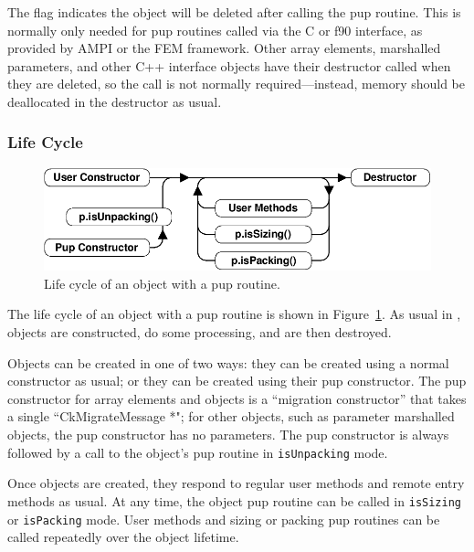 The  flag indicates the object will be deleted
after calling the pup routine.  This is normally only needed for
pup routines called via the C or f90 interface, as provided by 
AMPI or the FEM framework.  Other \charmpp{} array elements, 
marshalled parameters, and other C++ interface objects 
have their destructor called when they are deleted, so the 
 call is not normally required---instead,
memory should be deallocated in the destructor as usual.


\subsubsection{Life Cycle}
\label{sec:lifecycle}

\begin{figure}[h]
\begin{center}
\includegraphics[width=6.0in]{fig/pup}
\end{center}
\caption{Life cycle of an object with a pup routine.}
\label{fig:pup}
\end{figure}

The life cycle of an object with a pup routine is shown in 
Figure~\ref{fig:pup}.  As usual in \CC{}, objects are 
constructed, do some processing, and are then destroyed.

Objects can be created in one of two ways: they can
be created using a normal constructor as usual; or they
can be created using their pup constructor.  The pup constructor
for \charmpp{} array elements and  objects
is a ``migration constructor'' that takes a single ``CkMigrateMessage *";
for other objects, such as parameter marshalled objects,
the pup constructor has no parameters.  The pup constructor
is always followed by a call to the object's pup routine in
\verb.isUnpacking. mode.

Once objects are created, they respond to regular user methods
and remote entry methods as usual.  At any time, the object 
pup routine can be called in \verb.isSizing. or \verb.isPacking.
mode.  User methods and sizing or packing pup routines can be called
repeatedly over the object lifetime.

